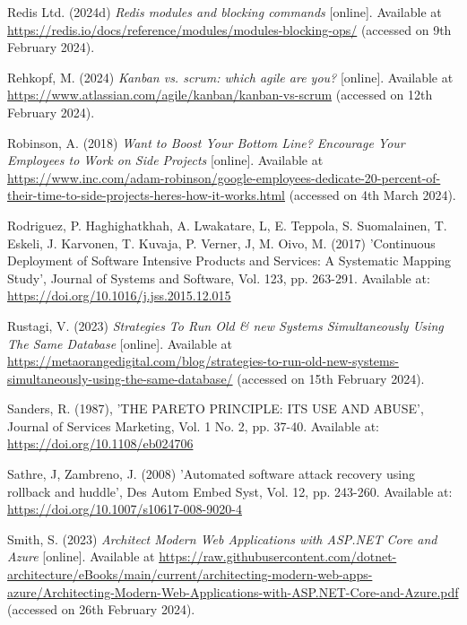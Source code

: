 \noindent Redis Ltd. (2024d) \textit{Redis modules and blocking commands} [online]. Available at \url{https://redis.io/docs/reference/modules/modules-blocking-ops/} (accessed on 9th February 2024).
\vspace{0.2cm}

\noindent Rehkopf, M. (2024) \textit{Kanban vs. scrum: which agile are you?} [online]. Available at \url{https://www.atlassian.com/agile/kanban/kanban-vs-scrum} (accessed on 12th February 2024).
\vspace{0.2cm}

\noindent Robinson, A. (2018) \textit{Want to Boost Your Bottom Line? Encourage Your Employees to Work on Side Projects} [online]. Available at \url{https://www.inc.com/adam-robinson/google-employees-dedicate-20-percent-of-their-time-to-side-projects-heres-how-it-works.html} (accessed on 4th March 2024).
\vspace{0.2cm}

\noindent Rodriguez, P. Haghighatkhah, A. Lwakatare, L, E. Teppola, S. Suomalainen, T. Eskeli, J. Karvonen, T. Kuvaja, P. Verner, J, M. Oivo, M. (2017) 'Continuous Deployment of Software Intensive Products and Services: A Systematic Mapping Study', Journal of Systems and Software, Vol. 123, pp. 263-291. Available at: \url{https://doi.org/10.1016/j.jss.2015.12.015}
\vspace{0.2cm}

\noindent Rustagi, V. (2023) \textit{Strategies To Run Old \& new Systems Simultaneously Using The Same Database} [online]. Available at \url{https://metaorangedigital.com/blog/strategies-to-run-old-new-systems-simultaneously-using-the-same-database/} (accessed on 15th February 2024).
\vspace{0.2cm}

\noindent Sanders, R. (1987), 'THE PARETO PRINCIPLE: ITS USE AND ABUSE', Journal of Services Marketing, Vol. 1 No. 2, pp. 37-40. Available at: \url{https://doi.org/10.1108/eb024706}
\vspace{0.2cm}

\noindent Sathre, J, Zambreno, J. (2008) 'Automated software attack recovery using rollback and huddle', Des Autom Embed Syst, Vol. 12, pp. 243-260. Available at: \url{https://doi.org/10.1007/s10617-008-9020-4}
\vspace{0.2cm}

\noindent Smith, S. (2023) \textit{Architect Modern Web Applications with ASP.NET Core and Azure} [online]. Available at \url{https://raw.githubusercontent.com/dotnet-architecture/eBooks/main/current/architecting-modern-web-apps-azure/Architecting-Modern-Web-Applications-with-ASP.NET-Core-and-Azure.pdf} (accessed on 26th February 2024).
\vspace{0.2cm}

